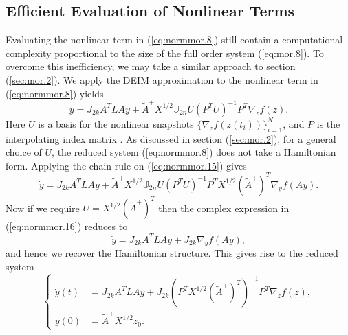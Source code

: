 \subsection{Efficient Evaluation of Nonlinear Terms} \label{sec:normmor.3}
Evaluating the nonlinear term in (\ref{eq:normmor.8}) still contain a computational complexity proportional to the size of the full order system (\ref{eq:mor.8}). To overcome this inefficiency, we may take a similar approach to section (\ref{sec:mor.2}). We apply the DEIM approximation to the nonlinear term in (\ref{eq:normmor.8}) yields
\begin{equation} \label{eq:normmor.15}
	\dot y = J_{2k} A^TLAy + \tilde A ^+ X^{1/2} \mathbb J_{2n} U (P^TU)^{-1} P^T \nabla_z f(z).
\end{equation}
Here $U$ is a basis for the nonlinear snapshots $\{\nabla_z f(z(t_i))\}_{i=1}^N$, and $P$ is the interpolating index matrix \cite{Chaturantabut:2010cz}. As discussed in section (\ref{sec:mor.2}), for a general choice of $U$, the reduced system (\ref{eq:normmor.8}) does not take a Hamiltonian form. Applying the chain rule on (\ref{eq:normmor.15}) gives
\begin{equation} \label{eq:normmor.16}
	\dot y = J_{2k} A^TLAy + \tilde A ^+ X^{1/2} \mathbb J_{2n} U (P^TU)^{-1} P^T X^{1/2} (\tilde A^+)^T \nabla_y f(Ay).
\end{equation}
Now if we require $U = X^{1/2} (\tilde A^+)^T$ then the complex expression in (\ref{eq:normmor.16}) reduces to
\begin{equation} \label{eq:normmor.17}
	\dot y = J_{2k} A^TLAy + J_{2k} \nabla_y f(Ay),
\end{equation}
and hence we recover the Hamiltonian structure. This gives rise to the reduced system
\begin{equation} \label{eq:normmor.18}
\left\{
\begin{aligned}
	\dot y(t) &= J_{2k} A^TLAy + J_{2k} (P^TX^{1/2} (\tilde A^+)^T)^{-1} P^T \nabla_z f(z), \\
	y(0) &= \tilde A^+ X^{1/2} z_0.
\end{aligned}
\right.
\end{equation}

